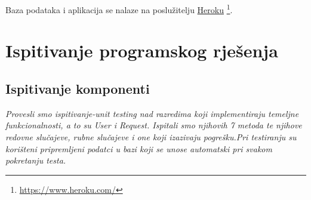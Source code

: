             Baza podataka i aplikacija se nalaze na poslužitelju \underline{Heroku}
            \footnote{\url{https://www.heroku.com/}}.
            
        
\newpage 

		    \section{Ispitivanje programskog rješenja}

        
        \subsection{Ispitivanje komponenti}
		    
	
    
			\textit { Provesli smo  ispitivanje-unit testing nad razredima koji implementiraju temeljne funkcionalnosti, a to su User i Request. Ispitali smo njihovih 7 metoda te njihove redovne slučajeve, rubne slučajeve i one koji izazivaju pogrešku.Pri testiranju su korišteni pripremljeni podatci u bazi koji se unose automatski pri svakom pokretanju testa. }
			
